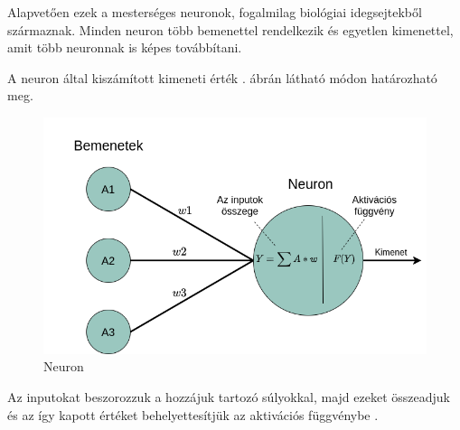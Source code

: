 Alapvetően ezek a mesterséges neuronok, fogalmilag biológiai idegsejtekből származnak.
Minden neuron több bemenettel rendelkezik és egyetlen kimenettel, amit több neuronnak is képes továbbítani.

\noindent A neuron által kiszámított kimeneti érték . ábrán látható módon határozható meg.
\begin{figure}[h!]
\centering
\includegraphics[scale=0.5]{images/neuron.png}
\caption{Neuron}
\label{fig:neuron}
\end{figure}

Az inputokat beszorozzuk a hozzájuk tartozó súlyokkal, majd ezeket összeadjuk és az így kapott értéket behelyettesítjük az aktivációs függvénybe \cite{hassoun1995fundamentals}.

